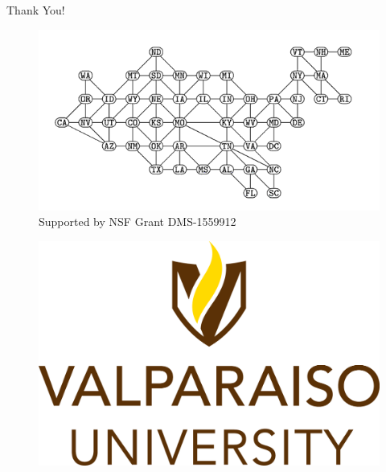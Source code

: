 \documentclass{beamer}
\begin{document}
\begin{frame}

\begin{center}
{\Huge Thank You!} \\ %
\begin{figure}
        \begin{minipage}[t]{0.48\textwidth}
        \centering
            \includegraphics[scale = 0.22]{contiguous-usa-graph}\\
            \scriptsize Supported by NSF Grant DMS-1559912
            \label{fig:nsf}
        \end{minipage}\hfill
        \begin{minipage}[t]{0.48\textwidth}
        \centering
            \includegraphics[scale = 0.25]{Valpo}
            \label{fig:valpo}
        \end{minipage}\hfill
    \end{figure}


\end{center}

\end{frame}
\end{document}
